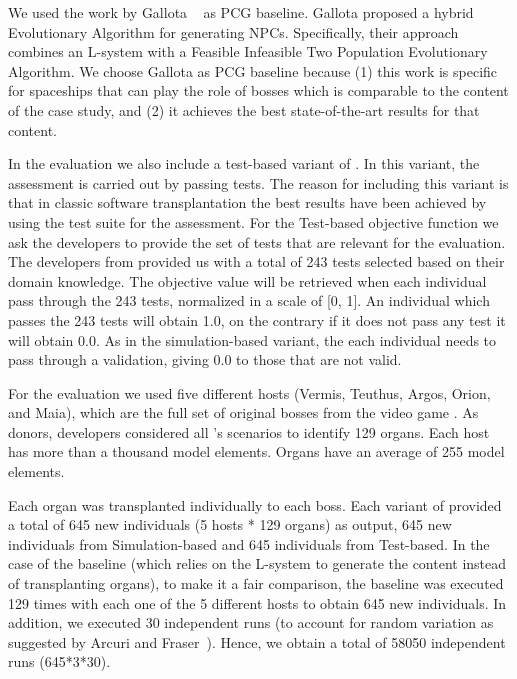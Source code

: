 We used the work by Gallota \etal~\cite{gallotta2022evolving} as PCG baseline. Gallota \etal proposed a hybrid Evolutionary Algorithm for generating NPCs. Specifically, their approach combines an L-system with a Feasible Infeasible Two Population Evolutionary Algorithm. We choose Gallota \etal as PCG baseline because (1) this work is specific for spaceships that can play the role of bosses which is comparable to the content of the case study, and (2) it achieves the best state-of-the-art results for that content. 

In the evaluation we also include a test-based variant of \ApproachName{}. In this variant, the assessment is carried out by passing tests. The reason for including this variant is that in classic software transplantation the best results have been achieved by using the test suite for the assessment.
For the Test-based objective function we ask the developers to provide the set of tests that are relevant for the evaluation. The developers from \CaseStudy{} provided us with a total of 243 tests selected based on their domain knowledge. The objective value will be retrieved when each individual pass through the 243 tests, normalized in a scale of [0, 1]. An individual which passes the 243 tests will obtain 1.0, on the
contrary if it does not pass any test it will obtain 0.0. As in the simulation-based variant, the each individual needs to pass through a validation, giving 0.0 to those that are not valid.

For the evaluation we used five different hosts (Vermis, Teuthus, Argos, Orion, and Maia), which are the full set of original bosses from the video game \CaseStudy{}. As donors, \CaseStudy{} developers considered all \CaseStudy{}'s scenarios to identify 129 organs. Each host has more than a thousand model elements. Organs have an average of 255 model elements.

Each organ was transplanted individually to each boss. Each variant of \ApproachName{} provided a total of 645 new individuals (5 hosts * 129 organs) as output, 645 new individuals from Simulation-based and 645 individuals from Test-based. In the case of the baseline (which relies on the L-system to generate the content instead of transplanting organs), to make it a fair comparison, the baseline was executed 129 times with each one of the 5 different hosts to obtain 645 new individuals. In addition, we executed 30 independent runs (to account for random variation as suggested by Arcuri and Fraser~\cite{arcuri2013parameter}). Hence, we obtain a total of 58050 independent runs (645*3*30).

